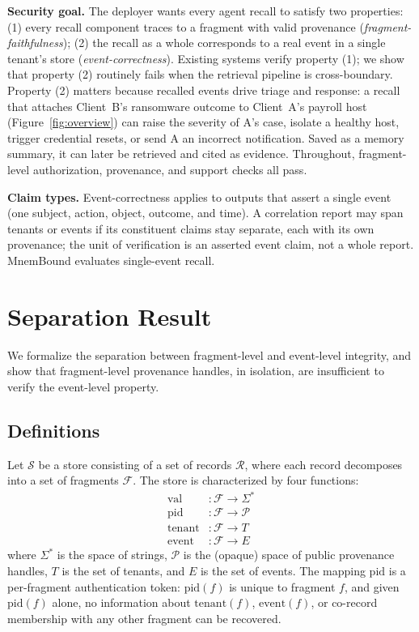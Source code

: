\documentclass[conference,compsoc]{IEEEtran}
\begin{document}
\textbf{Security goal.}
The deployer wants every agent recall to satisfy two properties: (1) every recall component traces to a fragment with valid provenance (\emph{fragment-faithfulness}); (2) the recall as a whole corresponds to a real event in a single tenant's store (\emph{event-correctness}). Existing systems verify property (1); we show that property (2) routinely fails when the retrieval pipeline is cross-boundary. Property (2) matters because recalled events drive triage and response: a recall that attaches Client~B's ransomware outcome to Client~A's payroll host (Figure~\ref{fig:overview}) can raise the severity of A's case, isolate a healthy host, trigger credential resets, or send A an incorrect notification. Saved as a memory summary, it can later be retrieved and cited as evidence. Throughout, fragment-level authorization, provenance, and support checks all pass.

\textbf{Claim types.}
Event-correctness applies to outputs that assert a single event (one subject, action, object, outcome, and time). A correlation report may span tenants or events if its constituent claims stay separate, each with its own provenance; the unit of verification is an asserted event claim, not a whole report. MnemBound evaluates single-event recall.


\section{Separation Result}\label{sec:separation}

We formalize the separation between fragment-level and event-level integrity, and show that fragment-level provenance handles, in isolation, are insufficient to verify the event-level property.

\subsection{Definitions}

Let $\mathcal{S}$ be a store consisting of a set of records $\mathcal{R}$, where each record decomposes into a set of fragments $\mathcal{F}$. The store is characterized by four functions:
\begin{align}
  \mathrm{val}      &: \mathcal{F} \to \Sigma^{*} \\
  \mathrm{pid}      &: \mathcal{F} \to \mathcal{P} \\
  \mathrm{tenant}   &: \mathcal{F} \to T \\
  \mathrm{event}    &: \mathcal{F} \to E
\end{align}
where $\Sigma^{*}$ is the space of strings, $\mathcal{P}$ is the (opaque) space of public provenance handles, $T$ is the set of tenants, and $E$ is the set of events. The mapping $\mathrm{pid}$ is a per-fragment authentication token: $\mathrm{pid}(f)$ is unique to fragment $f$, and given $\mathrm{pid}(f)$ alone, no information about $\mathrm{tenant}(f)$, $\mathrm{event}(f)$, or co-record membership with any other fragment can be recovered.
\end{document}
